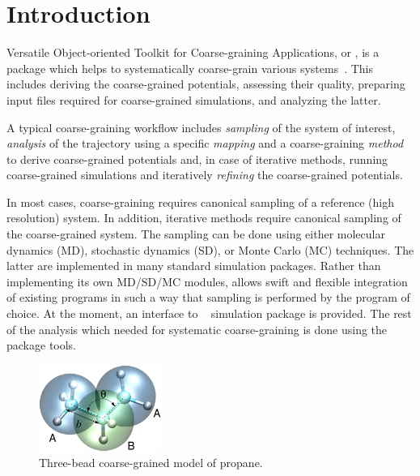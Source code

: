 \chapter{Introduction}
\label{sec:introduction}

Versatile Object-oriented Toolkit for Coarse-graining Applications, or \votca, is a package which helps to systematically coarse-grain various systems~\cite{Ruehle:2009.a}. This includes  deriving the coarse-grained potentials, assessing their quality, preparing input files required for coarse-grained simulations, and analyzing the latter.

A typical coarse-graining workflow includes {\em sampling} of the system of interest, {\em analysis} of the trajectory using a specific {\em mapping} and a coarse-graining {\em method} to derive coarse-grained potentials and, in case of iterative methods, running coarse-grained simulations and iteratively {\em refining} the coarse-grained potentials.

In most cases, coarse-graining requires canonical sampling of a reference (high resolution) system. In addition, iterative methods require canonical sampling of the coarse-grained system. The sampling can be done using either molecular dynamics (MD), stochastic dynamics (SD), or Monte Carlo (MC) techniques. The latter are implemented in many standard simulation packages. Rather than implementing its own MD/SD/MC modules, \votca allows swift and flexible integration of existing  programs in such a way that sampling is performed by the program of choice. At the moment, an interface to \gromacs~\cite{gromacs4} simulation package is provided. The rest of the analysis which needed for systematic coarse-graining is done using the package tools.

\begin{figure}
 \includegraphics[width=4cm]{fig/propane}
 \caption{\small Three-bead coarse-grained model of propane.
 \label{fig:intro:propane}
}
\end{figure}

